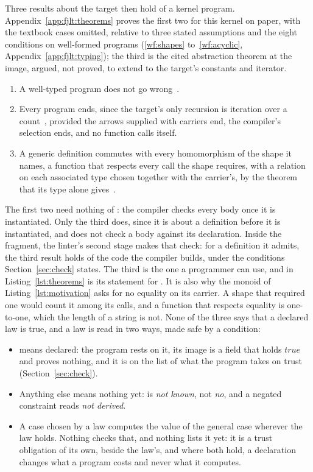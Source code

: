 Three results about the target then hold of a kernel program.
Appendix~\ref{app:fjlt:theorems} proves the first two for this kernel on paper, with the textbook cases omitted, relative to three stated assumptions and the eight conditions on well-formed programs (\ref{wf:shapes} to~\ref{wf:acyclic}, Appendix~\ref{app:fjlt:typing}); the third is the cited abstraction theorem at the image, argued, not proved, to extend to the target's constants and iterator.
\begin{enumerate}
\item A well-typed program does not go wrong~\cite{pierce2002tapl}.
\item Every program ends, since the target's only recursion is iteration over a count~\cite{girard1989proofs}, provided the arrows supplied with carriers end, the compiler's selection ends, and no function calls itself.
\item A generic definition commutes with every homomorphism of the shape it names, a function that respects every call the shape requires, with a relation on each associated type chosen together with the carrier's, by the theorem that its type alone gives~\cite{reynolds1983types,wadler1989theorems}.
\end{enumerate}
The first two need nothing of \RuleTwo{}: the compiler checks every body once it is instantiated.
Only the third does, since it is about a definition before it is instantiated, and \Cpp{} does not check a body against its declaration.
Inside the fragment, the linter's second stage makes that check: for a definition it admits, the third result holds of the code the compiler builds, under the conditions Section~\ref{sec:check} states.
The third is the one a programmer can use, and  in Listing~\ref{lst:theorems} is its statement for .
It is also why the monoid of Listing~\ref{lst:motivation} asks for no equality on its carrier.
A shape that required one would count it among its calls, and a function that respects equality is one-to-one, which the length of a string is not.
None of the three says that a declared law is true, and a law is read in two ways, made safe by a condition:
\begin{itemize}
\item {} means declared: the program rests on it, its image is a field that holds $\mathit{true}$ and proves nothing, and it is on the list of what the program takes on trust (Section~\ref{sec:check}).
\item Anything else means nothing yet:  is \emph{not known}, not \emph{no}, and a negated constraint reads \emph{not derived}.
\item A case chosen by a law computes the value of the general case wherever the law holds. Nothing checks that, and nothing lists it yet: it is a trust obligation of its own, beside the law's, and where both hold, a declaration changes what a program costs and never what it computes.
\end{itemize}

